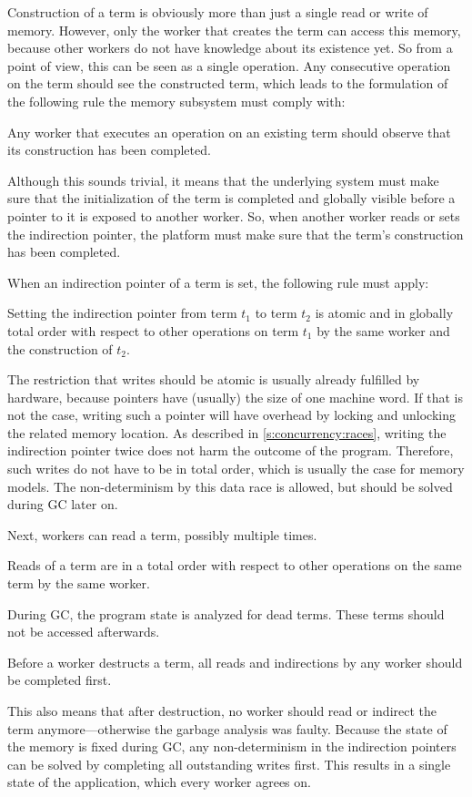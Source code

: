 Construction of a term is obviously more than just a single read or write of memory.
However, only the worker that creates the term can access this memory, because other workers do not have knowledge about its existence yet.
So from a  point of view, this can be seen as a single operation.
Any consecutive operation on the term should see the constructed term, which leads to the formulation of the following rule the memory subsystem must comply with:
\begin{ruledef}[Construction]\label{rule:construct}%
	Any worker that executes an operation on an existing term should observe that its construction has been completed.
\end{ruledef}
Although this sounds trivial, it means that the underlying system must make sure that the initialization of the term is completed and globally visible before a pointer to it is exposed to another worker.
So, when another worker reads or sets the indirection pointer, the platform must make sure that the term's construction has been completed.

When an indirection pointer of a term is set, the following rule must apply:
\begin{ruledef}[Indirect]\label{rule:indirect}%
	Setting the indirection pointer from term $t_1$ to term $t_2$ is atomic and in globally total order with respect to other operations on term $t_1$ by the same worker and the construction of $t_2$.
\end{ruledef}
The restriction that writes should be atomic is usually already fulfilled by hardware, because pointers have (usually) the size of one machine word.
If that is not the case, writing such a pointer will have overhead by locking and unlocking the related memory location.
As described in \cref{s:concurrency:races}, writing the indirection pointer twice does not harm the outcome of the program.
Therefore, such writes do not have to be in total order, which is usually the case for memory models.
The non-determinism by this data race is allowed, but should be solved during \ac{GC} later on.

Next, workers can read a term, possibly multiple times.
\begin{ruledef}[Read]\label{rule:read}%
	Reads of a term are in a total order with respect to other operations on the same term by the same worker.
\end{ruledef}

During \ac{GC}, the program state is analyzed for dead terms.
These terms should not be accessed afterwards.
\begin{ruledef}\label{rule:gc}%
	Before a worker destructs a term, all reads and indirections by any worker should be completed first.
\end{ruledef}
This also means that after destruction, no worker should read or indirect the term anymore---otherwise the garbage analysis was faulty.
Because the state of the memory is fixed during \ac{GC}, any non-determinism in the indirection pointers can be solved by completing all outstanding writes first.
This results in a single state of the application, which every worker agrees on.

